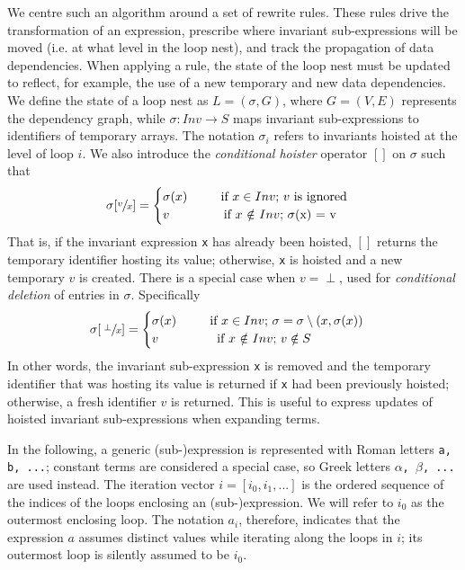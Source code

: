 We centre such an algorithm around a set of rewrite rules. These rules drive the transformation of an expression, prescribe where invariant sub-expressions will be moved (i.e. at what level in the loop nest), and track the propagation of data dependencies. When applying a rule, the state of the loop nest must be updated to reflect, for example, the use of a new temporary and new data dependencies. We define the state of a loop nest as $L = (\sigma, G)$, where $G = (V, E)$ represents the dependency graph, while $\sigma : Inv \rightarrow S$ maps invariant sub-expressions to identifiers of temporary arrays. The notation $\sigma_i$ refers to invariants hoisted at the level of loop $i$. We also introduce the \textit{conditional hoister} operator $[]$ on $\sigma$ such that
\begin{gather*}
\sigma[\sfrac{v}{x}] = 
\begin{cases}
\sigma(x) \text{~~~~~~~~if $x \in Inv$; $v$ is ignored}\\
v \text{~~~~~~~~~~~~~if $x$ $\notin$ $Inv$; $\sigma$(x) = v}\\
\end{cases}
\end{gather*}
That is, if the invariant expression \texttt{x} has already been hoisted, $[]$ returns the temporary identifier hosting its value; otherwise, \texttt{x} is hoisted and a new temporary $v$ is created. There is a special case when $v = \perp$, used for \textit{conditional deletion} of entries in $\sigma$. Specifically
\begin{gather*}
\sigma[\sfrac{\perp}{x}] = 
\begin{cases}
\sigma(x) \text{~~~~~~~~if $x \in Inv$; $\sigma = \sigma \setminus (x, \sigma(x))$}\\
v \text{~~~~~~~~~~~~~~if $x$ $\notin$ $Inv$; $v \notin S$}\\
\end{cases}
\end{gather*}
In other words, the invariant sub-expression \texttt{x} is removed and the temporary identifier that was hosting its value is returned if \texttt{x} had been previously hoisted; otherwise, a fresh identifier $v$ is returned. This is useful to express updates of hoisted invariant sub-expressions when expanding terms.

In the following, a generic (sub-)expression is represented with Roman letters \texttt{a, b, ...}; constant terms are considered a special case, so Greek letters \texttt{$\alpha$, $\beta$, ...} are used instead. The iteration vector $i = [i_0, i_1, ...]$ is the ordered sequence of the indices of the loops enclosing an (sub-)expression. We will refer to $i_0$ as the outermost enclosing loop. The notation $a_i$, therefore, indicates that the expression $a$ assumes distinct values while iterating along the loops in $i$; its outermost loop is silently assumed to be $i_0$. 

